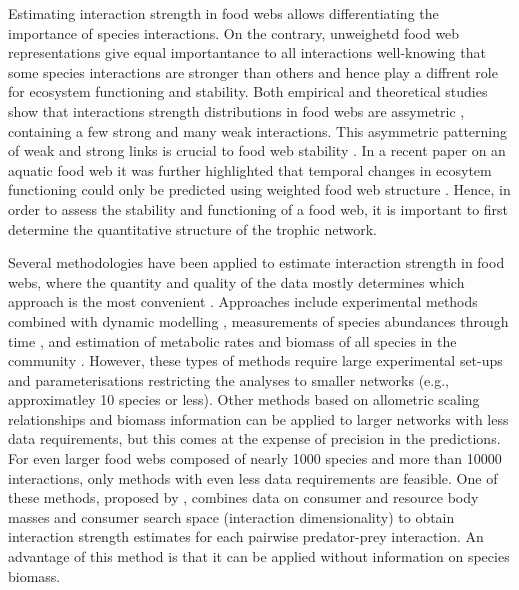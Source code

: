 \documentclass[gc, manuscript]{copernicus}
\begin{document}
Estimating interaction strength in food webs allows differentiating the
importance of species interactions. On the contrary, unweighetd food web
representations give equal importantance to all interactions
well-knowing that some species interactions are stronger than others and
hence play a diffrent role for ecosystem functioning and stability. Both
empirical and theoretical studies show that interactions strength
distributions in food webs are assymetric
\citep{Paine1992, McCann1998, Emmerson2004, Wootton2005, Kortsch2021},
containing a few strong and many weak interactions. This asymmetric
patterning of weak and strong links is crucial to food web stability
\citep{Paine1992, McCann1998, Neutel2002}. In a recent paper on an
aquatic food web it was further highlighted that temporal changes in
ecosytem functioning could only be predicted using weighted food web
structure \citep{Kortsch2021}. Hence, in order to assess the stability
and functioning of a food web, it is important to first determine the
quantitative structure of the trophic network.

Several methodologies have been applied to estimate interaction strength
in food webs, where the quantity and quality of the data mostly
determines which approach is the most convenient \citep{Berlow2004}.
Approaches include experimental methods combined with dynamic modelling
\citep{Emmerson2004, Carrara2015}, measurements of species abundances
through time \citep{Fahimipour2014, Chang2021}, and estimation of
metabolic rates and biomass of all species in the community
\citep{Neutel2014}. However, these types of methods require large
experimental set-ups and parameterisations restricting the analyses to
smaller networks (e.g., approximatley 10 species or less). Other methods
based on allometric scaling relationships and biomass information
\citep{Kortsch2021, Gauzens2019} can be applied to larger networks with
less data requirements, but this comes at the expense of precision in
the predictions. For even larger food webs composed of nearly 1000
species and more than 10000 interactions, only methods with even less
data requirements are feasible. One of these methods, proposed by
\citet{Pawar2012}, combines data on consumer and resource body masses
and consumer search space (interaction dimensionality) to obtain
interaction strength estimates for each pairwise predator-prey
interaction. An advantage of this method is that it can be applied
without information on species biomass.
\end{document}
